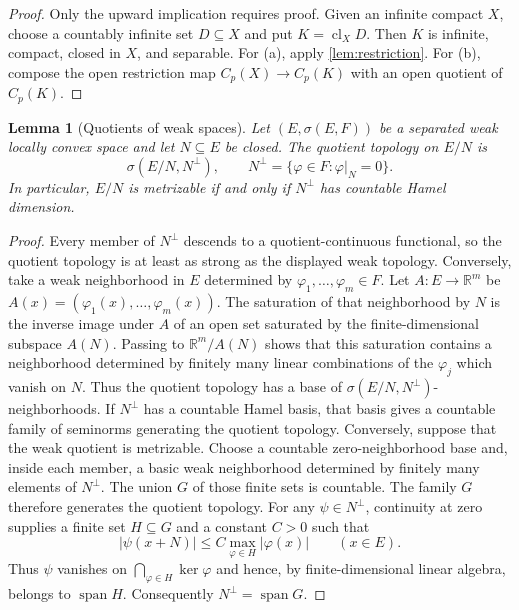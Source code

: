 \documentclass[11pt]{article}
\newtheorem{lemma}[theorem]{Lemma}
\newcommand{\Cp}{C_p}
\newcommand{\spann}{\operatorname{span}}
\newcommand{\cl}{\operatorname{cl}}
\newcommand{\R}{\mathbb{R}}
\begin{document}
\begin{proof}
Only the upward implication requires proof.  Given an infinite compact $X$,
choose a countably infinite set $D\subseteq X$ and put $K=\cl_XD$.  Then $K$
is infinite, compact, closed in $X$, and separable.  For \textup{(a)}, apply
\cref{lem:restriction}.  For \textup{(b)}, compose the open restriction map
$\Cp(X)\to\Cp(K)$ with an open quotient of $\Cp(K)$.
\end{proof}

\begin{lemma}[Quotients of weak spaces]\label{lem:weak-quotient}
Let $(E,\sigma(E,F))$ be a separated weak locally convex space and let
$N\subseteq E$ be closed.  The quotient topology on $E/N$ is
\[
 \sigma(E/N,N^\perp),
 \qquad
 N^\perp=\{\varphi\in F:\varphi|_N=0\}.
\]
In particular, $E/N$ is metrizable if and only if $N^\perp$ has countable
Hamel dimension.
\end{lemma}

\begin{proof}
Every member of $N^\perp$ descends to a quotient-continuous functional, so the
quotient topology is at least as strong as the displayed weak topology.
Conversely, take a weak neighborhood in $E$ determined by
$\varphi_1,\ldots,\varphi_m\in F$.  Let
$A:E\to\R^m$ be $A(x)=(\varphi_1(x),\ldots,\varphi_m(x))$.
The saturation of that neighborhood by $N$ is the inverse image under $A$ of
an open set saturated by the finite-dimensional subspace $A(N)$.  Passing to
$\R^m/A(N)$ shows that this saturation contains a neighborhood determined by
finitely many linear combinations of the $\varphi_j$ which vanish on $N$.
Thus the quotient topology has a base of $\sigma(E/N,N^\perp)$-neighborhoods.
If $N^\perp$ has a countable Hamel basis, that basis gives a countable
family of seminorms generating the quotient topology.  Conversely, suppose
that the weak quotient is metrizable.  Choose a countable zero-neighborhood
base and, inside each member, a basic weak neighborhood determined by finitely
many elements of $N^\perp$.  The union $G$ of those finite sets is countable.
The family $G$ therefore generates the quotient topology.  For any
$\psi\in N^\perp$, continuity at zero supplies a finite set
$H\subseteq G$ and a constant $C>0$ such that
\[
 |\psi(x+N)|\leq C\max_{\varphi\in H}|\varphi(x)|
 \qquad(x\in E).
\]
Thus $\psi$ vanishes on $\bigcap_{\varphi\in H}\ker\varphi$ and hence, by
finite-dimensional linear algebra, belongs to $\spann H$.  Consequently
$N^\perp=\spann G$.
\end{proof}
\end{document}
